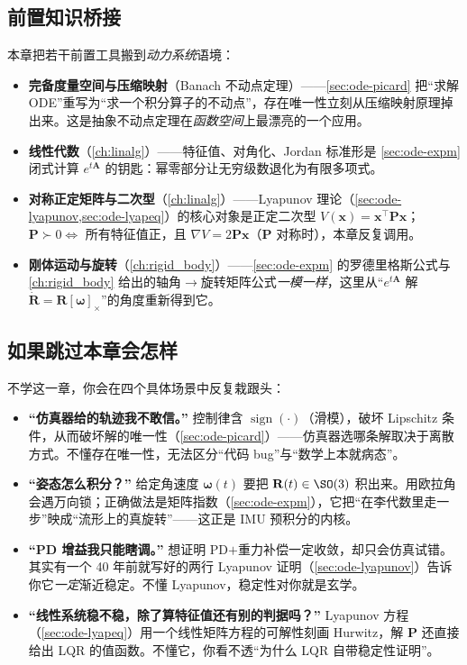 \subsection*{前置知识桥接}
本章把若干前置工具搬到\emph{动力系统}语境：
\begin{itemize}
  \item \textbf{完备度量空间与压缩映射}（Banach 不动点定理）——\cref{sec:ode-picard} 把“求解 ODE”重写为“求一个积分算子的不动点”，存在唯一性立刻从压缩映射原理掉出来。这是抽象不动点定理在\emph{函数空间}上最漂亮的一个应用。
  \item \textbf{线性代数}（\cref{ch:linalg}）——特征值、对角化、Jordan 标准形是 \cref{sec:ode-expm} 闭式计算 $e^{t\mathbf{A}}$ 的钥匙：幂零部分让无穷级数退化为有限多项式。
  \item \textbf{对称正定矩阵与二次型}（\cref{ch:linalg}）——Lyapunov 理论（\cref{sec:ode-lyapunov,sec:ode-lyapeq}）的核心对象是正定二次型 $V(\mathbf{x})=\mathbf{x}^\top\mathbf{P}\mathbf{x}$；$\mathbf{P}\succ0\iff$ 所有特征值正，且 $\nabla V=2\mathbf{P}\mathbf{x}$（$\mathbf{P}$ 对称时），本章反复调用。
  \item \textbf{刚体运动与旋转}（\cref{ch:rigid_body}）——\cref{sec:ode-expm} 的罗德里格斯公式与 \cref{ch:rigid_body} 给出的轴角$\to$旋转矩阵公式\emph{一模一样}，这里从“$e^{t\mathbf{A}}$ 解 $\dot{\mathbf{R}}=\mathbf{R}[\boldsymbol{\omega}]_\times$”的角度重新得到它。
\end{itemize}

\subsection*{如果跳过本章会怎样}
不学这一章，你会在四个具体场景中反复栽跟头：
\begin{itemize}
  \item \textbf{“仿真器给的轨迹我不敢信。”} 控制律含 $\operatorname{sign}(\cdot)$（滑模），破坏 Lipschitz 条件，从而破坏解的唯一性（\cref{sec:ode-picard}）——仿真器选哪条解取决于离散方式。不懂存在唯一性，无法区分“代码 bug”与“数学上本就病态”。
  \item \textbf{“姿态怎么积分？”} 给定角速度 $\boldsymbol{\omega}(t)$ 要把 $\mathbf{R}(t)\in\SO(3)$ 积出来。用欧拉角会遇万向锁；正确做法是矩阵指数（\cref{sec:ode-expm}），它把“在李代数里走一步”映成“流形上的真旋转”——这正是 IMU 预积分的内核。
  \item \textbf{“PD 增益我只能瞎调。”} 想证明 PD$+$重力补偿一定收敛，却只会仿真试错。其实有一个 40 年前就写好的两行 Lyapunov 证明（\cref{sec:ode-lyapunov}）告诉你它\emph{一定}渐近稳定。不懂 Lyapunov，稳定性对你就是玄学。
  \item \textbf{“线性系统稳不稳，除了算特征值还有别的判据吗？”} Lyapunov 方程（\cref{sec:ode-lyapeq}）用一个线性矩阵方程的可解性刻画 Hurwitz，解 $\mathbf{P}$ 还直接给出 LQR 的值函数。不懂它，你看不透“为什么 LQR 自带稳定性证明”。
\end{itemize}


